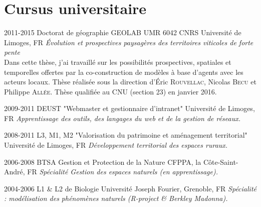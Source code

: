 \documentclass[]{cv-etienne}
\begin{document}
\section{Cursus universitaire}
\begin{entrylist}
\entry
{2011-2015}
{Doctorat de géographie {\normalfont GEOLAB UMR 6042 CNRS}}
{ Université de Limoges, FR}
{\emph{\'Evolution et prospectives paysagères des territoires viticoles de forte pente} \\Dans cette thèse, j'ai travaillé sur les possibilités prospectives, spatiales et temporelles offertes par la co-construction de modèles à base d'agents avec les acteurs locaux. Thèse réalisée sous la direction d'\'Eric \textsc{Rouvellac}, Nicolas \textsc{Becu} et Philippe \textsc{Allée}. Thèse qualifiée au CNU (section 23) en janvier 2016.}
\end{entrylist}

\begin{entrylist}
\entry
{2009-2011}
{DEUST {\normalfont "Webmaster et gestionnaire d’intranet"}}
{Université de Limoges, FR}
{\emph{Apprentissage des outils, des langages du web et de la gestion de réseaux.}}
\end{entrylist}

\begin{entrylist}
\entry
{2008-2011}
{L3, M1, M2 {\normalfont "Valorisation du patrimoine et aménagement territorial"}}
{ Université de Limoges, FR}
{\emph{Développement territorial des espaces ruraux.}}
\end{entrylist}

\begin{entrylist}
\entry
{2006-2008}
{BTSA {\normalfont Gestion et Protection de la Nature }}
{ CFPPA, la Côte-Saint-André, FR}
{\emph{Spécialité Gestion des espaces naturels (en apprentissage).}}
\end{entrylist}

\begin{entrylist}
\entry
{2004-2006}
{L1 \& L2 de Biologie}
{ Université Joseph Fourier, Grenoble, FR}
{\emph{Spécialité : modélisation des phénomènes naturels (R-project \& Berkley Madonna).}}
\end{entrylist}
\end{document}
